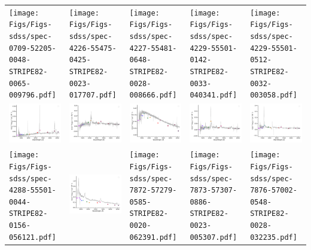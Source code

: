 \begin{center}
\begin{longtable}{l l l l l }
    \texttt{[image: Figs/Figs-sdss/spec-0709-52205-0048-STRIPE82-0065-009796.pdf]} & \texttt{[image: Figs/Figs-sdss/spec-4226-55475-0425-STRIPE82-0023-017707.pdf]} & \texttt{[image: Figs/Figs-sdss/spec-4227-55481-0648-STRIPE82-0028-008666.pdf]} & \texttt{[image: Figs/Figs-sdss/spec-4229-55501-0142-STRIPE82-0033-040341.pdf]} & \texttt{[image: Figs/Figs-sdss/spec-4229-55501-0512-STRIPE82-0032-003058.pdf]} \\
    \includegraphics[width=0.19\linewidth, clip]{Figs/Figs-sdss/spec-4234-55478-0651-STRIPE82-0044-019857.pdf} & \includegraphics[width=0.19\linewidth, clip]{Figs/Figs-sdss/spec-4236-55479-0206-STRIPE82-0049-010030.pdf} & \includegraphics[width=0.19\linewidth, clip]{Figs/Figs-sdss/spec-4237-55478-0412-STRIPE82-0049-025567.pdf} & \includegraphics[width=0.19\linewidth, clip]{Figs/Figs-sdss/spec-4240-55455-0669-STRIPE82-0058-035027.pdf} & \includegraphics[width=0.19\linewidth, clip]{Figs/Figs-sdss/spec-4241-55450-0894-STRIPE82-0062-010390.pdf} \\
    \texttt{[image: Figs/Figs-sdss/spec-4288-55501-0044-STRIPE82-0156-056121.pdf]} & \includegraphics[width=0.19\linewidth, clip]{Figs/Figs-sdss/spec-4302-55531-0350-STRIPE82-0012-042042.pdf} & \texttt{[image: Figs/Figs-sdss/spec-7872-57279-0585-STRIPE82-0020-062391.pdf]} & \texttt{[image: Figs/Figs-sdss/spec-7873-57307-0886-STRIPE82-0023-005307.pdf]} & \texttt{[image: Figs/Figs-sdss/spec-7876-57002-0548-STRIPE82-0028-032235.pdf]} \\

\end{longtable}
\end{center}
